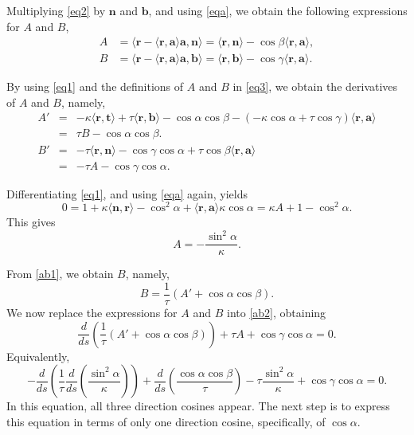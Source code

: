 \documentclass[a4paper,12pt]{amsart}
\theoremstyle{plain}
\theoremstyle{definition}
\newcommand{\bfr}{\mathbf{r}}
\newcommand{\bfa}{\mathbf{a}}
\newcommand{\bft}{\mathbf{t}}
\newcommand{\bfn}{\mathbf{n}}
\newcommand{\bfb}{\mathbf{b}}
\begin{document}
Multiplying \eqref{eq2} by $\bfn$ and $\bfb$, and using \eqref{eqa}, we obtain the following expressions for $A$ and $B$, 
\begin{equation}\label{eq3}
\begin{split}
A&=\langle \bfr-\langle\bfr,\bfa\rangle \bfa,\bfn\rangle=\langle\bfr,\bfn\rangle-\cos\beta\langle\bfr,\bfa\rangle,\\
B&=\langle \bfr-\langle\bfr,\bfa\rangle \bfa,\bfb\rangle=\langle\bfr,\bfb\rangle-\cos\gamma\langle\bfr,\bfa\rangle.
\end{split}
\end{equation}
 
 

 By using \eqref{eq1} and the definitions of $A$ and $B$ in \eqref{eq3}, we obtain the derivatives of $A$ and $B$, namely,  
\begin{eqnarray}
 A' &=&  -\kappa\langle\bfr,\bft\rangle + \tau \langle\bfr,\bfb\rangle -\cos\alpha\cos\beta -(-\kappa\cos\alpha+\tau\cos\gamma)\langle\bfr,\bfa\rangle\nonumber\\
 &=&\tau B -\cos\alpha\cos\beta.\label{ab1}\\
 B'& =&  -\tau \langle\bfr ,\bfn\rangle - \cos\gamma\cos\alpha+\tau\cos\beta \langle\bfr,\bfa\rangle\nonumber	\\	
 &=&-\tau A- \cos\gamma\cos\alpha.\label{ab2}
\end{eqnarray}

Differentiating \eqref{eq1}, and using \eqref{eqa} again,  yields
\[    0  = 1+ \kappa \langle\bfn,\bfr\rangle-\cos^2\alpha + \langle \bfr, \bfa\rangle\kappa \cos\alpha= \kappa A + 1 - \cos^2\alpha.
\]
This gives 
\begin{equation}\label{eq4}
    A = - \frac{\sin^2\alpha}{\kappa}.
\end{equation}
 
 From \eqref{ab1}, we obtain $B$, namely,
 \begin{equation}\label{ab3}
 B=\frac{1}{\tau}\left(A'+\cos\alpha\cos\beta\right).
 \end{equation}
 We now replace the expressions for $A$ and $B$   into  \eqref{ab2}, obtaining  
 $$\frac{d}{ds}\left(\frac{1}{\tau}\left(A'+\cos\alpha\cos\beta\right)\right)+\tau A+\cos\gamma\cos\alpha=0.$$
 Equivalently, 
 \begin{equation}\label{ab33}
 -\frac{d}{ds}\left(\frac{1}{\tau} \frac{d}{ds}\left(\frac{\sin^2\alpha}{\kappa}\right)\right)+\frac{d}{ds}\left(\frac{\cos\alpha\cos\beta}{\tau} \right)-\tau \frac{\sin^2\alpha}{\kappa}+\cos\gamma\cos\alpha=0.
 \end{equation}
In this equation, all three direction cosines appear.   The next step is to express this equation in terms of only one direction cosine, specifically, of  $\cos\alpha$.
\end{document}
